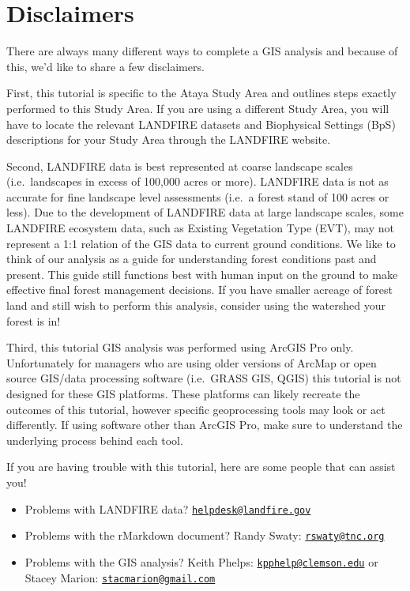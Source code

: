\documentclass[
]{book}
\providecommand{\tightlist}{%
  \setlength{\itemsep}{0pt}\setlength{\parskip}{0pt}}
\begin{document}
\hypertarget{disclaimers}{%
\section{Disclaimers}\label{disclaimers}}

There are always many different ways to complete a GIS analysis and because of this, we'd like to share a few disclaimers.

First, this tutorial is specific to the Ataya Study Area and outlines steps exactly performed to this Study Area. If you are using a different Study Area, you will have to locate the relevant LANDFIRE datasets and Biophysical Settings (BpS) descriptions for your Study Area through the LANDFIRE website.

Second, LANDFIRE data is best represented at coarse landscape scales (i.e.~landscapes in excess of 100,000 acres or more). LANDFIRE data is not as accurate for fine landscape level assessments (i.e.~a forest stand of 100 acres or less). Due to the development of LANDFIRE data at large landscape scales, some LANDFIRE ecosystem data, such as Existing Vegetation Type (EVT), may not represent a 1:1 relation of the GIS data to current ground conditions. We like to think of our analysis as a guide for understanding forest conditions past and present. This guide still functions best with human input on the ground to make effective final forest management decisions. If you have smaller acreage of forest land and still wish to perform this analysis, consider using the watershed your forest is in!

Third, this tutorial GIS analysis was performed using ArcGIS Pro only. Unfortunately for managers who are using older versions of ArcMap or open source GIS/data processing software (i.e.~GRASS GIS, QGIS) this tutorial is not designed for these GIS platforms. These platforms can likely recreate the outcomes of this tutorial, however specific geoprocessing tools may look or act differently. If using software other than ArcGIS Pro, make sure to understand the underlying process behind each tool.

If you are having trouble with this tutorial, here are some people that can assist you!

\begin{itemize}
\tightlist
\item
  Problems with LANDFIRE data? \href{mailto:helpdesk@landfire.gov}{\nolinkurl{helpdesk@landfire.gov}}
\item
  Problems with the rMarkdown document? Randy Swaty: \href{mailto:rswaty@tnc.org}{\nolinkurl{rswaty@tnc.org}}
\item
  Problems with the GIS analysis? Keith Phelps: \href{mailto:kpphelp@clemson.edu}{\nolinkurl{kpphelp@clemson.edu}} or Stacey Marion: \href{mailto:stacmarion@gmail.com}{\nolinkurl{stacmarion@gmail.com}}
\end{itemize}
\end{document}
